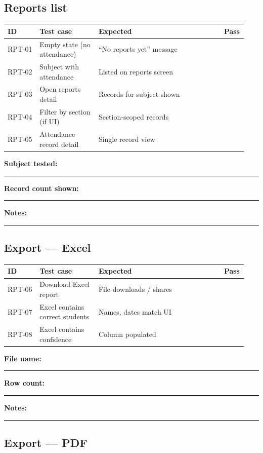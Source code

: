 \documentclass[11pt,a4paper,oneside]{article}
\newcommand{\chk}{\fbox{\rule{0pt}{1.05ex}\rule{1.05ex}{0pt}}}
\newcommand{\fillin}[1][3.5cm]{\rule{#1}{0.4pt}}
\newcommand{\fillinlong}{\rule{0.72\textwidth}{0.4pt}}
\newcommand{\notesblock}{\par\smallskip\noindent\textbf{Notes:}\ \fillinlong\par\smallskip}
\newcommand{\fieldline}[1]{\par\smallskip\noindent\textbf{#1}\ \fillin\par}
\newcommand{\tcheadfour}{%
  \toprule
  \textbf{ID} & \textbf{Test case} & \textbf{Expected} & \textbf{Pass} \\
  \midrule
}
\begin{document}
\subsection{Reports list}

\small
\begin{tabular}{@{}>{\raggedright\arraybackslash}p{0.13\linewidth} >{\raggedright\arraybackslash}p{0.24\linewidth} >{\raggedright\arraybackslash}p{0.51\linewidth} >{\centering\arraybackslash}p{0.06\linewidth}@{}}
  \tcheadfour
  RPT-01 & Empty state (no attendance)  & ``No reports yet'' message       & \chk \\
  RPT-02 & Subject with attendance      & Listed on reports screen         & \chk \\
  RPT-03 & Open reports detail          & Records for subject shown        & \chk \\
  RPT-04 & Filter by section (if UI)    & Section-scoped records           & \chk \\
  RPT-05 & Attendance record detail     & Single record view               & \chk \\
  \bottomrule
\end{tabular}
\normalsize

\fieldline{Subject tested:}
\fieldline{Record count shown:}
\notesblock

\subsection{Export — Excel}

\small
\begin{tabular}{@{}>{\raggedright\arraybackslash}p{0.13\linewidth} >{\raggedright\arraybackslash}p{0.24\linewidth} >{\raggedright\arraybackslash}p{0.51\linewidth} >{\centering\arraybackslash}p{0.06\linewidth}@{}}
  \tcheadfour
  RPT-06 & Download Excel report         & File downloads / shares          & \chk \\
  RPT-07 & Excel contains correct students & Names, dates match UI          & \chk \\
  RPT-08 & Excel contains confidence     & Column populated                 & \chk \\
  \bottomrule
\end{tabular}
\normalsize

\fieldline{File name:}
\fieldline{Row count:}
\notesblock

\subsection{Export — PDF}
\end{document}
